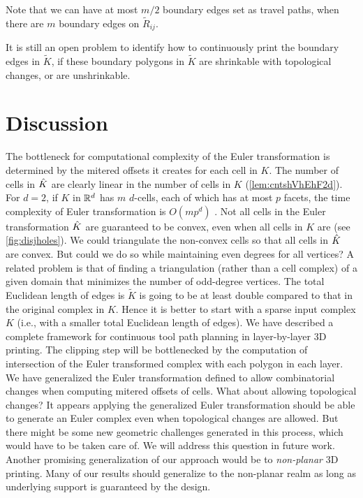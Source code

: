    Note that we can have at most $m/2$ boundary edges set as travel paths, when there are $m$ boundary edges on $\tilde{R}_{ij}$.

   \begin{rem}
     {\rm It is still an open problem to identify how to continuously print the boundary edges in $\tilde{K}$, if these boundary polygons  in $\tilde{K}$ are shrinkable with topological changes, or are unshrinkable.}
   \end{rem} 
\section{Discussion}\label{sec:experiment}
\vspace*{-0.1in}

The bottleneck for computational complexity of the Euler transformation is determined by the mitered offsets it creates for each cell in $K$.
The number of cells in $\hat{K}$ are clearly linear in the number of cells in $K$ (\cref{lem:cntshVhEhF2d}).
For $d=2$, if $K$ in ${\mathbb R}^d$ has $m$ $d$-cells, each of which has at most $p$ facets, the time complexity of Euler transformation is $O(m p^d)$ \cite{AuWa2013,AuWa2016}.
Not all cells in the Euler transformation $\hat{K}$ are guaranteed to be convex, even when all cells in $K$ are (see \cref{fig:disjholes}).
We could triangulate the non-convex cells so that all cells in $\hat{K}$ are convex.
But could we do so while maintaining even degrees for all vertices?
A related problem is that of finding a triangulation (rather than a cell complex) of a given domain that minimizes the number of odd-degree vertices.
The total Euclidean length of edges is $\tilde{K}$ is going to be at least double compared to that in the original complex in $K$.
Hence it is better to start with a sparse input complex $K$ (i.e., with a smaller total Euclidean length of edges).
We have described a complete framework for continuous tool path planning in layer-by-layer 3D printing.
The clipping step will be bottlenecked by the computation of intersection of the Euler transformed complex with each polygon in each layer.
We have generalized the Euler transformation defined to allow combinatorial changes when computing mitered offsets of cells.
What about allowing topological changes?
It appears applying the generalized Euler transformation should be able to generate an Euler complex even when topological changes are allowed.
But there might be some new geometric challenges generated in this process, which would have to be taken care of.
We will address this question in future work.
Another promising generalization of our approach would be to \emph{non-planar} 3D printing.
Many of our results should generalize to the non-planar realm as long as underlying support is guaranteed by the design.